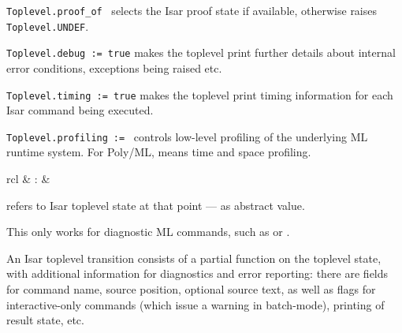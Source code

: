 \begin{isabellebody}
\begin{isamarkuptext}
\begin{description}
  \item \verb|Toplevel.proof_of|~ selects the Isar proof
  state if available, otherwise raises \verb|Toplevel.UNDEF|.

  \item \verb|Toplevel.debug := true| makes the toplevel print further
  details about internal error conditions, exceptions being raised
  etc.

  \item \verb|Toplevel.timing := true| makes the toplevel print timing
  information for each Isar command being executed.

  \item \verb|Toplevel.profiling|~\verb|:=|~ controls
  low-level profiling of the underlying ML runtime system.  For
  Poly/ML,  means time and  space
  profiling.

  \end{description}%
\end{isamarkuptext}%
\isamarkuptrue%
%
\endisatagmlref
{\isafoldmlref}%
%
\isadelimmlref
%
\endisadelimmlref
%
\isadelimmlantiq
%
\endisadelimmlantiq
%
\isatagmlantiq
%
\begin{isamarkuptext}%
\begin{matharray}{rcl}
  \hypertarget{ML antiquotation.Isar.state}{\hyperlink{ML antiquotation.Isar.state}{\mbox{}}} & : &  \\
  \end{matharray}

  \begin{description}

  \item {} refers to Isar toplevel state at that
  point --- as abstract value.

  This only works for diagnostic ML commands, such as \hyperlink{command.ML-val}{\mbox{}} or \hyperlink{command.ML-command}{\mbox{}}.

  \end{description}%
\end{isamarkuptext}%
\isamarkuptrue%
%
\endisatagmlantiq
{\isafoldmlantiq}%
%
\isadelimmlantiq
%
\endisadelimmlantiq
%
\isamarkuptrue%
%
\begin{isamarkuptext}%
An Isar toplevel transition consists of a partial function on the
  toplevel state, with additional information for diagnostics and
  error reporting: there are fields for command name, source position,
  optional source text, as well as flags for interactive-only commands
  (which issue a warning in batch-mode), printing of result state,
  etc.


\end{isamarkuptext}
\end{isabellebody}

